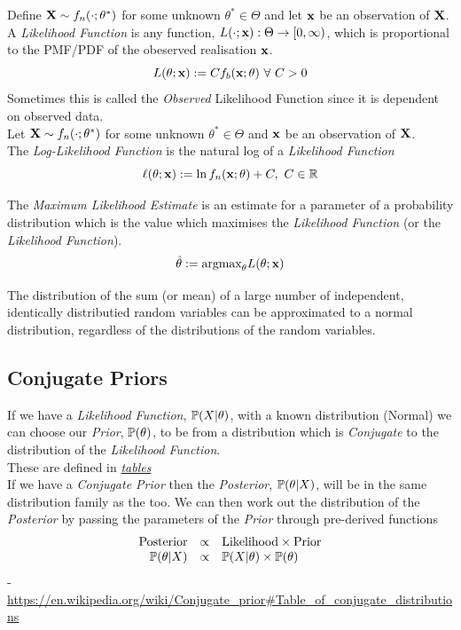 \documentclass[11pt,a4paper]{article}
\begin{document}
Define $\textbf{X}\sim f_n(\cdot;\theta^*)$ for some unknown $\theta^*\in\Theta$ and let $\textbf{x}$ be an observation of $\textbf{X}$.\\
A \textit{Likelihood Function} is any function, $L(\cdot;\textbf{x}):\Theta\to[0,\infty)$, which is proportional to the PMF/PDF of the obeserved realisation $\textbf{x}$.
$$L(\theta;\x):=Cf_b(\x;\theta)\ \forall\ C>0$$
\nb Sometimes this is called the \textit{Observed} Likelihood Function since it is dependent on observed data.\\

Let $\textbf{X}\sim f_n(\cdot;\theta^*)$ for some unknown $\theta^*\in\Theta$ and $\textbf{x}$ be an observation of $\textbf{X}$.\\
The \textit{Log-Likelihood Function} is the natural log of a \textit{Likelihood Function}
$$\ell(\theta;\x):=\ln f_n(\x;\theta)+C,\ C\in\reals$$

The \textit{Maximum Likelihood Estimate} is an estimate for a parameter of a probability distribution which is the value which maximises the \textit{Likelihood Function} (or the \textit{Likelihood Function}).
$$\hat{\theta}:=\text{argmax}_\theta L(\theta;\textbf{x})$$

The distribution of the sum (or mean) of a large number of independent, identically distributied random variables can be approximated to a normal distribution, regardless of the distributions of the random variables.

\subsection{Conjugate Priors}

If we have a \textit{Likelihood Function}, $\mathbb{P}(X|\theta)$, with a known distribution (\eg Normal) we can choose our \textit{Prior}, $\mathbb{P}(\theta)$, to be from a distribution which is \textit{Conjugate} to the distribution of the \textit{Likelihood Function}.\\
These are defined in \href{https://en.wikipedia.org/wiki/Conjugate_prior#Table_of_conjugate_distributions}{\textit{tables}}\\

If we have a \textit{Conjugate Prior} then the \textit{Posterior}, $\mathbb{P}(\theta|X)$, will be in the same distribution family as the  too. We can then work out the distribution of the \textit{Posterior} by passing the parameters of the \textit{Prior} through pre-derived functions
\[\begin{array}{rcl}
\text{Posterior}&\propto&\text{Likelihood}\times\text{Prior}\\
\mathbb{P}(\theta|X)&\propto&\mathbb{P}(X|\theta)\times\mathbb{P}(\theta)
\end{array}\]
\nb - \url{https://en.wikipedia.org/wiki/Conjugate_prior#Table_of_conjugate_distributions}\\
\end{document}
